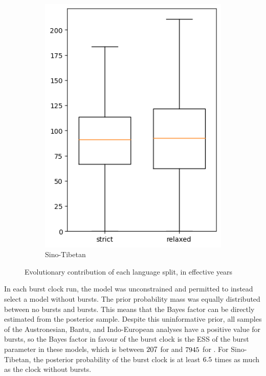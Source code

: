 \documentclass[]{rsos}%
\begin{document}
\begin{figure}
\begin{subfigure}{0.4\textwidth}
    \includegraphics[width=\textwidth]{supplement/analysis/sinotibetan_years_per_split.png}
    \caption{Sino-Tibetan}
  \end{subfigure}
  \caption{Evolutionary contribution of each language split, in effective years}
  \label{f:peryear}
\end{figure}

In each burst clock run, the model was unconstrained and permitted to instead
select a model without bursts. The prior probability mass was equally distributed
between no bursts and bursts. This means that the Bayes factor can be directly estimated from the posterior sample.
Despite this uninformative prior, all samples of the
Austronesian, Bantu, and Indo-European analyses have a positive value for bursts,
so the Bayes factor in favour of the burst clock is the ESS of
the burst parameter in these models, which is between $207$ for \minessn{} and
$7945$ for \maxessn{}. For Sino-Tibetan,
the posterior probability of the burst clock is at least $6.5$ times as much as the clock
without bursts.
\end{document}
